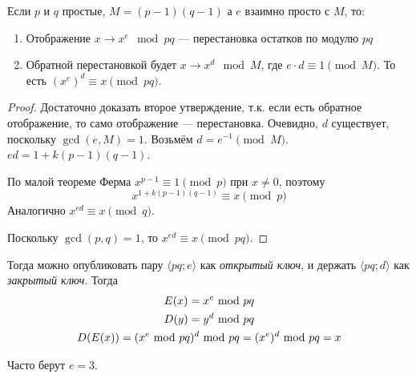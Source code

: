 \begin{theorem}
    Если $p$ и $q$ простые,
    $M = (p - 1) (q - 1)$
    а $e$ взаимно просто
    с $M$, то:
    \begin{enumerate}
        \item Отображение $x \to x^e \mod pq$
        --- перестановка остатков по модулю $pq$
        \item Обратной перестановкой будет $x \to x^d \mod M$,
        где $e \cdot d \equiv 1 \pmod{M}$.
        То есть $(x^e)^d \equiv x \pmod{pq}$.
    \end{enumerate}
\end{theorem}
\begin{proof}
    Достаточно доказать второе утверждение,
    т.к. если есть обратное отображение, то само отображение --- перестановка.
    Очевидно, $d$ существует, поскольку $\gcd(e, M) = 1$.
    Возьмём $d = e^{-1} \pmod{M}$.
    $ed = 1 + k(p - 1)(q - 1)$.

    По малой теореме Ферма
    $x^{p - 1} \equiv 1 \pmod p$ при $x \ne 0$, поэтому
    \[ x^{1 + k(p - 1)(q - 1)} \equiv x \pmod p \]
    Аналогично $x^{ed} \equiv x \pmod q$.

    Поскольку $\gcd(p, q) = 1$,
    то $x^{ed} \equiv x \pmod{pq}$.
\end{proof}

Тогда можно опубликовать пару $\langle pq; e \rangle$
как \emph{открытый ключ}, и держать $\langle pq; d \rangle$
как \emph{закрытый ключ}.
Тогда
\begin{gather*}
    E(x) = x^e ~\text{mod}~ pq \\
    D(y) = y^d ~\text{mod}~ pq \\
    D(E(x)) = (x^e ~\text{mod}~ pq)^d ~\text{mod}~ pq = (x^e)^d ~\text{mod}~ pq = x
\end{gather*}

Часто берут $e = 3$.
